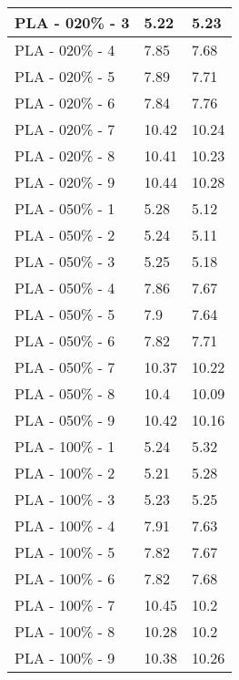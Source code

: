 \begin{longtable}{ | X | X | X | }
	PLA - 020\% - 3 & 5.22 & 5.23 \\ \hline
	PLA - 020\% - 4 & 7.85 & 7.68 \\ \hline
	PLA - 020\% - 5 & 7.89 & 7.71 \\ \hline
	PLA - 020\% - 6 & 7.84 & 7.76 \\ \hline
	PLA - 020\% - 7 & 10.42 & 10.24 \\ \hline
	PLA - 020\% - 8 & 10.41 & 10.23 \\ \hline
	PLA - 020\% - 9 & 10.44 & 10.28 \\ \hline
	PLA - 050\% - 1 & 5.28 & 5.12 \\ \hline
	PLA - 050\% - 2 & 5.24 & 5.11 \\ \hline
	PLA - 050\% - 3 & 5.25 & 5.18 \\ \hline
	PLA - 050\% - 4 & 7.86 & 7.67 \\ \hline
	PLA - 050\% - 5 & 7.9 & 7.64 \\ \hline
	PLA - 050\% - 6 & 7.82 & 7.71 \\ \hline
	PLA - 050\% - 7 & 10.37 & 10.22 \\ \hline
	PLA - 050\% - 8 & 10.4 & 10.09 \\ \hline
	PLA - 050\% - 9 & 10.42 & 10.16 \\ \hline
	PLA - 100\% - 1 & 5.24 & 5.32 \\ \hline
	PLA - 100\% - 2 & 5.21 & 5.28 \\ \hline
	PLA - 100\% - 3 & 5.23 & 5.25 \\ \hline
	PLA - 100\% - 4 & 7.91 & 7.63 \\ \hline
	PLA - 100\% - 5 & 7.82 & 7.67 \\ \hline
	PLA - 100\% - 6 & 7.82 & 7.68 \\ \hline
	PLA - 100\% - 7 & 10.45 & 10.2 \\ \hline
	PLA - 100\% - 8 & 10.28 & 10.2 \\ \hline
	PLA - 100\% - 9 & 10.38 & 10.26 \\ \hline
\end{longtable}